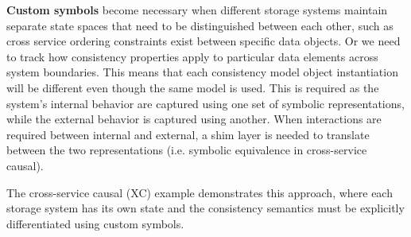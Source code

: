 {  \textbf{Custom symbols} become necessary when different storage
  systems maintain separate state spaces that need to
  be distinguished between each other, such as cross service ordering
  constraints exist between specific data objects.
  Or we need to track how consistency properties apply to particular data
  elements across system boundaries. This means that each consistency model
  object instantiation will be different even though the same model is used.
  This is required as the system's internal behavior are captured using one set
  of symbolic representations, while the external behavior is captured using
  another. When interactions are required between internal and external, a shim
  layer is needed to translate between the two representations (i.e.
  symbolic equivalence in cross-service causal).

  The cross-service causal (XC) example demonstrates this approach, where each
  storage system has its own state and the consistency semantics must
  be explicitly differentiated using custom symbols.
}
